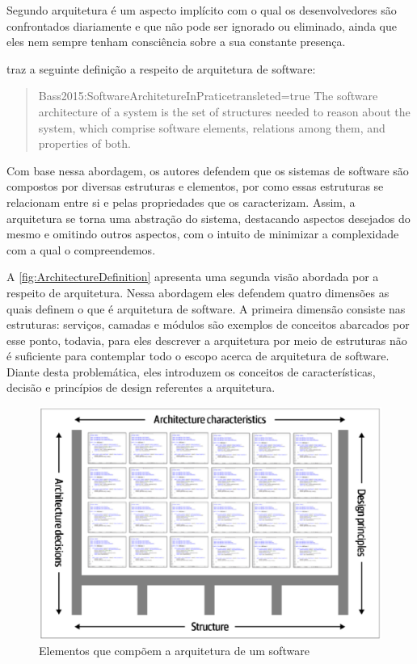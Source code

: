 Segundo  arquitetura é um aspecto implícito com o qual os desenvolvedores são confrontados
diariamente e que não pode ser ignorado ou eliminado, ainda que eles nem sempre tenham consciência
sobre a sua constante presença.

 traz a seguinte definição a respeito de
arquitetura de software:

\begin{quotation}{Bass2015:SoftwareArchitetureInPratice}{transleted=true}
The software architecture of a system is the set of structures needed to
reason about the system, which comprise software elements, relations
among them, and properties of both.
\end{quotation}

Com base nessa abordagem, os autores defendem que os sistemas de software são compostos por diversas
estruturas e elementos, por como essas estruturas se relacionam entre si e pelas propriedades que os
caracterizam. Assim, a arquitetura se torna uma abstração do sistema, destacando aspectos desejados
do mesmo e omitindo outros aspectos, com o intuito de minimizar a complexidade com a qual o compreendemos.

A \autoref{fig:ArchitectureDefinition} apresenta uma segunda visão abordada por
 a respeito de arquitetura.
Nessa abordagem eles defendem quatro dimensões as quais definem o que é arquitetura de software. A primeira
dimensão consiste nas estruturas: serviços, camadas e módulos são exemplos de conceitos abarcados
por esse ponto, todavia, para eles descrever a arquitetura por meio de estruturas não é suficiente para contemplar
todo o escopo acerca de arquitetura de software. Diante desta problemática, eles introduzem os
conceitos de características, decisão e princípios de design referentes a arquitetura. 

\begin{figure}[h]
  \centering
  \includegraphics[keepaspectratio=true,scale=0.6]{figuras/richardsAndFord-architectureDefinition.eps}
  \caption{Elementos que compõem a arquitetura de um software\label{fig:ArchitectureDefinition} }
\end{figure}

